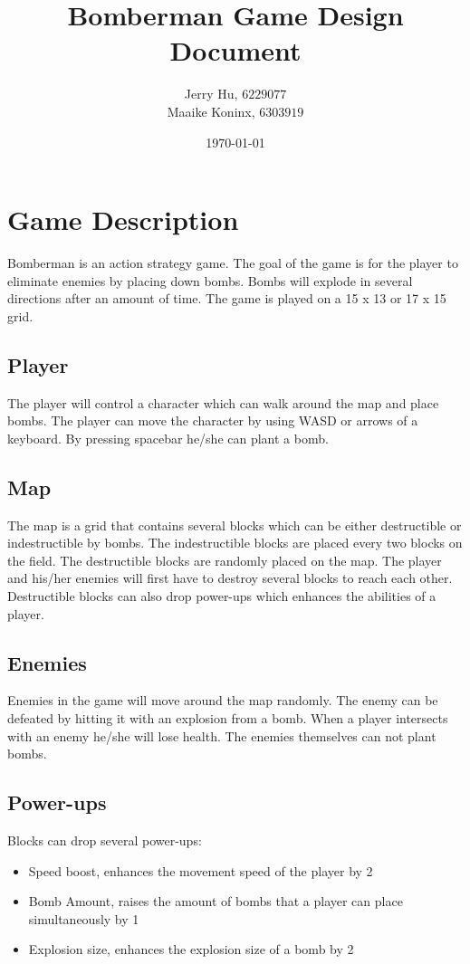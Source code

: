 \documentclass[a4paper, 12]{article}
\begin{document}
		
		\title{Bomberman Game Design Document}
		\author{Jerry Hu, $6229077$ \\ Maaike Koninx, $6303919$}
		\date{\today}	
		\maketitle
		
		\section{Game Description}
			Bomberman is an action strategy game. The goal of the game is for the player to eliminate enemies by placing down bombs. Bombs will explode in several directions after an amount of time. The game is played on a 15 x 13 or 17 x 15 grid. 
		
		\subsection{Player}
		The player will control a character which can walk around the map and place bombs. The player can move the character by using WASD or arrows of a keyboard. By pressing spacebar he/she can plant a bomb. 
		\subsection{Map}			
			The map is a grid that contains several blocks which can be either destructible or indestructible by bombs. The indestructible blocks are placed every two blocks on the field. The destructible blocks are randomly placed on the map. The player and his/her enemies will first have to destroy several blocks to reach each other. Destructible blocks can also drop power-ups which enhances the abilities of a player. 
		
		\subsection{Enemies}
		
		Enemies in the game will move around the map randomly. The enemy can be defeated by hitting it with an explosion from a bomb. When a player intersects with an enemy he/she will lose health. The enemies themselves can not plant bombs.
		
		\subsection{Power-ups}
		Blocks can drop several power-ups:
		\begin{itemize}
			\item Speed boost, enhances the movement speed of the player by 2
			\item Bomb Amount, raises the amount of bombs that a player can place simultaneously by 1
			\item Explosion size, enhances the explosion size of a bomb by 2
		\end{itemize}
\end{document}
